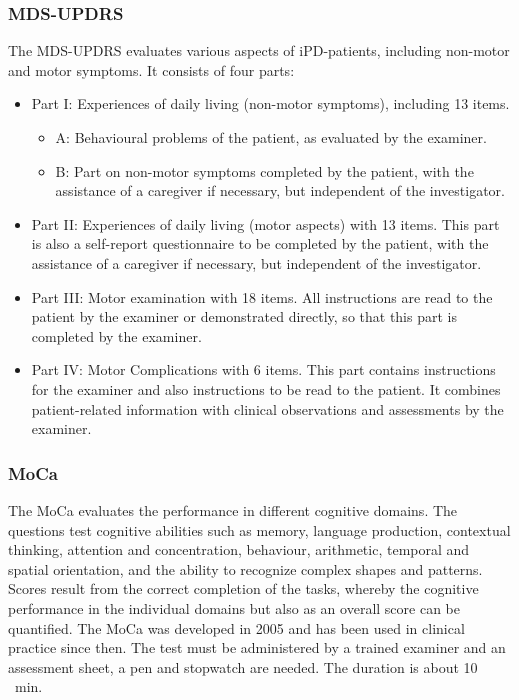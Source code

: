 \subsubsection{\acf{MDS-UPDRS}}
\label{questionnaires:updrs}
The \ac{MDS-UPDRS} \cite{goetz2007updrs} evaluates various aspects of \ac{iPD}-patients, including non-motor and motor symptoms. It consists of four parts:
\begin{itemize}
\item Part I: Experiences of daily living (non-motor symptoms), including 13 items.
\begin{itemize}
\item A: Behavioural problems of the patient, as evaluated by the examiner.
\item B: Part on non-motor symptoms completed by the patient, with the assistance of a caregiver if necessary, but independent of the investigator.
\end{itemize}
\item Part II: Experiences of daily living (motor aspects) with 13 items. This part is also a self-report questionnaire to be completed by the patient, with the assistance of a caregiver if necessary, but independent of the investigator.
\item Part III: Motor examination with 18 items. All instructions are read to the patient by the examiner or demonstrated directly, so that this part is completed by the examiner.
\item Part IV: Motor Complications with 6 items. This part contains instructions for the examiner and also instructions to be read to the patient. It combines patient-related information with clinical observations and assessments by the examiner.
\end{itemize}

\subsubsection{\acf{MoCa}}
\label{questionnaires:MoCa}
The \acl{MoCa} evaluates the performance in different cognitive domains. The questions test cognitive abilities such as memory, language production, contextual thinking, attention and concentration, behaviour, arithmetic, temporal and spatial orientation, and the ability to recognize complex shapes and patterns. Scores result from the correct completion of the tasks, whereby the cognitive performance in the individual domains but also as an overall score can be quantified. The \ac{MoCa} was developed in 2005 \cite{nasreddine2005moca} and has been used in clinical practice since then. The test must be administered by a trained examiner and an assessment sheet, a pen and stopwatch are needed. The duration is about \num[round-precision = 0, round-mode=places]{10} \SI{}{\minute}.


